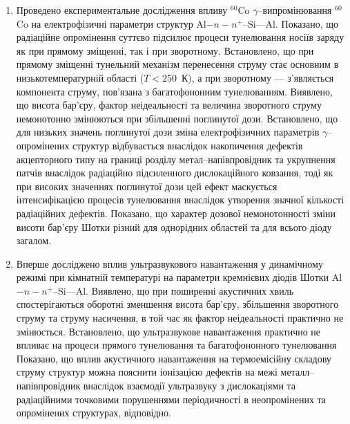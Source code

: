 \begin{enumerate}[leftmargin=0cm,itemindent=3em]
\item Проведено експериментальне дослідження впливу $^{60}$Co $\gamma$--ви\-про\-мі\-ню\-ван\-ня $^{60}$Co на електрофізичні параметри структур Al$-n-n^+$--Si---Al.
     Показано, що радіаційне опромінення суттєво підсилює процеси тунелювання носіїв заряду як при прямому зміщенні, так і при зворотному.
     Встановлено, що при прямому зміщенні тунельний механізм перенесення струму стає основним в низькотемпературній області ($T<250$~К),
а при зворотному --- з'являється компонента струму, пов'язана з багатофононним тунелюванням.
 Виявлено, що висота бар'єру, фактор неідеальності та величина зворотного струму немонотонно змінюються при збільшенні поглинутої дози.
Встановлено, що для низьких значень поглинутої дози зміна електрофізичних параметрів $\gamma$--оп\-ро\-мі\-не\-них структур
відбувається внаслідок накопичення дефектів акцепторного типу на границі розділу
метал--напівпровідник та укрупнення патчів внаслідок радіаційно підсиленного дислокаційного ковзання, тоді як при високих значеннях поглинутої дози
цей ефект маскується інтенсифікацією процесів тунелювання внаслідок утворення значної кількості радіаційних дефектів.
Показано, що характер дозової немонотонності зміни висоти бар'єру Шотки різний для   однорідних областей та для всього діоду загалом.

\item
Вперше досліджено вплив ультразвукового навантаження у динамічному режимі при кімнатній температурі на параметри кремнієвих діодів Шотки Al$-n-n^+$--Si---Al.
Виявлено, що при поширенні акустичних хвиль спостерігаються оборотні зменшення висота бар'єру,
збільшення зворотного струму та струму насичення, в той час як фактор неідеальності практично не змінюється.
Встановлено, що ультразвукове навантаження практично не впливає на процеси прямого тунелювання та багатофононного тунелювання
Показано, що вплив акустичного навантаження на термоемісійну складову струму структур можна пояснити іонізацією дефектів на межі металл--напівпровідник
  внаслідок взаємодії ультразвуку з дислокаціями та радіаційними точковими порушеннями періодичності в неопромінених та опромінених структурах, відповідно.


\end{enumerate}
